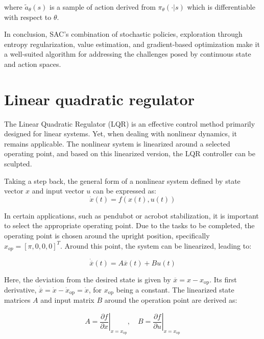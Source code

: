 where \(\widetilde{a}_{\theta}(s)\) is a sample of action derived from \(\pi_\theta(\cdot|s)\) which is differentiable with respect to \(\theta\). 

In conclusion, SAC's combination of stochastic policies, exploration through
entropy regularization, value estimation, and gradient-based optimization make
it a well-suited algorithm for addressing the challenges posed by continuous
state and action spaces.

\section{Linear quadratic regulator}
The Linear Quadratic Regulator (LQR)\cite{lehtomaki1981robustness} is an effective control method primarily designed for linear systems. Yet, when dealing with nonlinear dynamics, it remains applicable. The nonlinear system is linearized around a selected operating point, and based on this linearized version, the LQR controller can be sculpted.

Taking a step back, the general form of a nonlinear system defined by state vector \(x\) and input vector \(u\) can be expressed as:
\begin{equation}
 \dot{x}(t) = f(x(t), u(t))
\end{equation}

In certain applications, such as pendubot or acrobot stabilization, it is important to select the appropriate operating point. Due to the tasks to be completed, the operating point is chosen around the upright position, specifically \(x_{op} = [\pi,0,0,0]^T\). Around this point, the system can be linearized, leading to:

\begin{equation}
\dot{\overline{x}}(t) = A \overline{x}(t) + B u(t)
\end{equation}

Here, the deviation from the desired state is given by \(\overline{x} = x - x_{\text{op}}\). Its first derivative, \(\dot{\overline{x}} = \dot{x} - \dot{x}_{\text{op}} = \dot{x}\), for \(x_{\text{op}}\) being a constant. The linearized state matrices \(A\) and input matrix \(B\) around the operation point are derived as:

\begin{equation}
A = \left.\frac{\partial f}{\partial x}\right|_{x = x_{\text{op}}}, \quad B = \left.\frac{\partial f}{\partial u}\right|_{x = x_{\text{op}}}
\end{equation}

